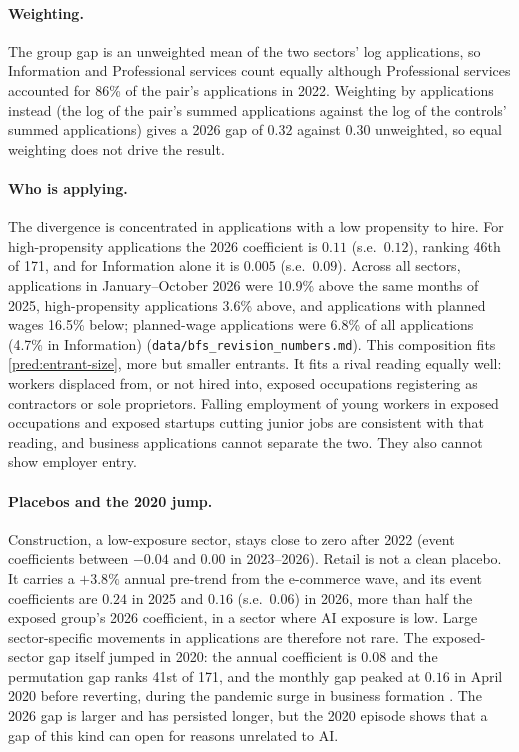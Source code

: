 \paragraph{Weighting.}
The group gap is an unweighted mean of the two sectors' log applications, so Information and Professional services count equally although Professional services accounted for 86\% of the pair's applications in 2022.
Weighting by applications instead (the log of the pair's summed applications against the log of the controls' summed applications) gives a 2026 gap of $0.32$ against $0.30$ unweighted, so equal weighting does not drive the result.

\paragraph{Who is applying.}
The divergence is concentrated in applications with a low propensity to hire.
For high-propensity applications the 2026 coefficient is $0.11$ (s.e.\ $0.12$), ranking 46th of 171, and for Information alone it is $0.005$ (s.e.\ $0.09$).
Across all sectors, applications in January--October 2026 were 10.9\% above the same months of 2025, high-propensity applications 3.6\% above, and applications with planned wages 16.5\% below; planned-wage applications were 6.8\% of all applications (4.7\% in Information) (\texttt{data/bfs\_revision\_numbers.md}).
This composition fits \cref{pred:entrant-size}, more but smaller entrants.
It fits a rival reading equally well: workers displaced from, or not hired into, exposed occupations registering as contractors or sole proprietors.
Falling employment of young workers in exposed occupations \citep{brynjolfsson2025canaries} and exposed startups cutting junior jobs \citep{gupta2026generative} are consistent with that reading, and business applications cannot separate the two.
They also cannot show employer entry.

\paragraph{Placebos and the 2020 jump.}
Construction, a low-exposure sector, stays close to zero after 2022 (event coefficients between $-0.04$ and $0.00$ in 2023--2026).
Retail is not a clean placebo.
It carries a $+3.8\%$ annual pre-trend from the e-commerce wave, and its event coefficients are $0.24$ in 2025 and $0.16$ (s.e.\ $0.06$) in 2026, more than half the exposed group's 2026 coefficient, in a sector where AI exposure is low.
Large sector-specific movements in applications are therefore not rare.
The exposed-sector gap itself jumped in 2020: the annual coefficient is $0.08$ and the permutation gap ranks 41st of 171, and the monthly gap peaked at $0.16$ in April 2020 before reverting, during the pandemic surge in business formation \citep{decker2023surging}.
The 2026 gap is larger and has persisted longer, but the 2020 episode shows that a gap of this kind can open for reasons unrelated to AI.

